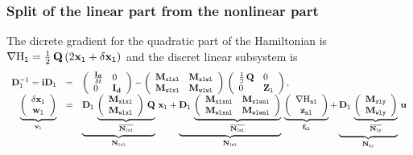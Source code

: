 \documentclass[10pt,a4paper]{article}
\begin{document}
\subsubsection{Split of the linear part from the nonlinear part}
%
The dicrete gradient for the quadratic part of the Hamiltonian is ${\small \nabla{\mathrm{H}}_{\mathtt{l}} =\frac{1}{2}\,\mathbf{Q}\, (2{\mathbf{x}}_{\mathtt{l}} + \delta {\mathbf{x}}_{\mathtt{l}})}$ and the discret linear subsystem is
%
\begin{equation}
\begin{array}{rcl}
\mathbf{D}_{\mathtt{l}}^{-1} = \mathbf{iD}_{\mathtt{l}} &=& \left(\begin{array}{ll}
\frac{\mathbf{I_d}}{\delta t}&0 \\ 
0 &\mathbf{I_d}
\end{array}\right)-\left(\begin{array}{ll}
\mathbf{M}_{\mathtt{xlxl}}&\mathbf{M}_{\mathtt{xlwl}} \\ 
\mathbf{M}_{\mathtt{wlxl}}&\mathbf{M}_{\mathtt{wlwl}} 
\end{array}\right)\,\left(\begin{array}{ll}
\frac{1}{2}\,\mathbf{Q}&0 \\ 
0 &\mathbf{Z}_{\mathtt{l}}
\end{array}\right),\\
\underbrace{\left(\begin{array}{c}
\delta {\mathbf{x}}_{\mathtt{l}}\\
{\mathbf{w}}_{\mathtt{l}}
\end{array}\right) 
}_{\mathbf{v}_{\mathtt{l}}}
& = &
\underbrace{\mathbf{D}_{\mathtt{l}}\,
\underbrace{\left(\begin{array}{ll}
\mathbf{M}_{\mathtt{xlxl}}\\ 
\mathbf{M}_{\mathtt{wlxl}}
\end{array}\right)\,\mathbf{Q}}_{\overline{\mathbf{N}_{\mathtt{lxl}}}}}_{\mathbf{N}_{\mathtt{lxl}}}
\, 
{\mathbf{x}}_{\mathtt{l}}
+
  \underbrace{\mathbf{D}_{\mathtt{l}}\,
\underbrace{\left(\begin{array}{ll}
\mathbf{M}_{\mathtt{xlxnl}}& \mathbf{M}_{\mathtt{xlwnl}} \\ 
 \mathbf{M}_{\mathtt{wlxnl}}& \mathbf{M}_{\mathtt{wlwnl}} 
\end{array}\right)}_{\overline{\mathbf{N}_{\mathtt{lnl}}}}}_{\mathbf{N}_{\mathtt{lnl}}}
\,
\underbrace{\left(\begin{array}{c}
\nabla{\mathrm{H}}_{\mathtt{nl}}\\
{\mathbf{z}}_{\mathtt{nl}}
\end{array}\right) 
}_{\mathbf{f}_{\mathtt{nl}}}
+
  \underbrace{\mathbf{D}_{\mathtt{l}}\,
\underbrace{\left(\begin{array}{l}
 \mathbf{M}_{\mathtt{xly}}\\ 
 \mathbf{M}_{\mathtt{wly}}
\end{array}\right)}_{\overline{\mathbf{N}_{\mathtt{ly}}}}}_{\mathbf{N}_{\mathtt{ly}}}
\,
{\mathbf{u}}
\end{array}
\end{equation}
%
\end{document}
